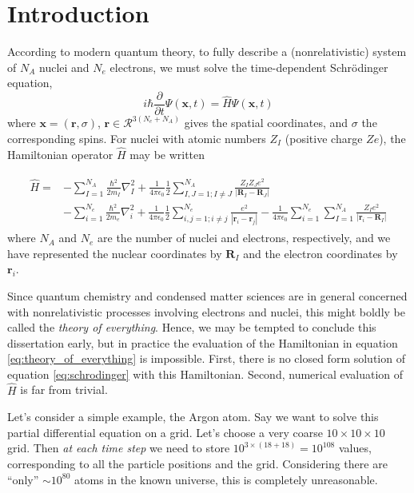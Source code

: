 \chapter{Introduction}
\label{chap:intro}

According to modern quantum theory, to fully describe a (nonrelativistic) system of $N_A$ nuclei and $N_e$ electrons, we must solve the time-dependent Schr\"odinger equation,
\begin{equation}
    \label{eq:schrodinger}
    i \hbar \frac{\partial}{\partial t} \Psi(\bm{x}, t)
    = \hat{H} \Psi(\bm{x}, t)
\end{equation}
where $\bm x=(\bm{r}, \sigma)$, $\bm r\in\mathcal{R}^{3(N_e+N_A)}$ gives the spatial coordinates, and $\sigma$ the corresponding spins. For nuclei with atomic numbers $Z_I$ (positive charge $Ze$), the Hamiltonian operator $\hat H$ may be written

\begin{align}
\begin{split}
\label{eq:theory_of_everything}
\hat H =& -\sum_{I=1}^{N_A}\frac{\hbar^2}{2m_I} \nabla^2_I
+ \frac 1{4\pi\epsilon_0} \frac 12\sum_{I,J=1;I\neq J}^{N_A} \frac{Z_IZ_Je^2}{|\bm R_I-\bm R_J|} \\
&- \sum_{i=1}^{N_e} \frac{\hbar^2}{2m_e} \nabla^2_i
+ \frac 1{4\pi\epsilon_0} \frac 12\sum_{i,j=1;i\neq j}^{N_e} \frac{e^2}{|\bm r_i-\bm r_j|}
- \frac 1{4\pi\epsilon_0}\sum_{i=1}^{N_e} \sum_{I=1}^{N_A} \frac{Z_I e^2}{|\bm r_i-\bm R_I|}
\end{split}
\end{align}
where $N_A$ and $N_e$ are the number of nuclei and electrons, respectively, and we have represented the nuclear coordinates by $\bm R_I$ and the electron coordinates by $\bm r_i$.

Since quantum chemistry and condensed matter sciences are in general concerned with nonrelativistic processes involving electrons and nuclei, this might boldly be called the \emph{theory of everything}.\cite{laughlinTheory2000} Hence, we may be tempted to conclude this dissertation early, but in practice the evaluation of the Hamiltonian in equation \ref{eq:theory_of_everything} is impossible. First, there is no closed form solution of equation \ref{eq:schrodinger} with this Hamiltonian. Second, numerical evaluation of $\hat H$ is far from trivial.

Let's consider a simple example, the Argon atom. Say we want to solve this partial differential equation on a grid. Let's choose a very coarse $10\times 10\times 10$ grid. Then \emph{at each time step} we need to store $10^{3\times (18+18)}=10^{108}$ values, corresponding to all the particle positions and the grid. Considering there are ``only'' $\sim 10^{80}$ atoms in the known universe,\cite{rydenIntroduction2017} this is completely unreasonable.

